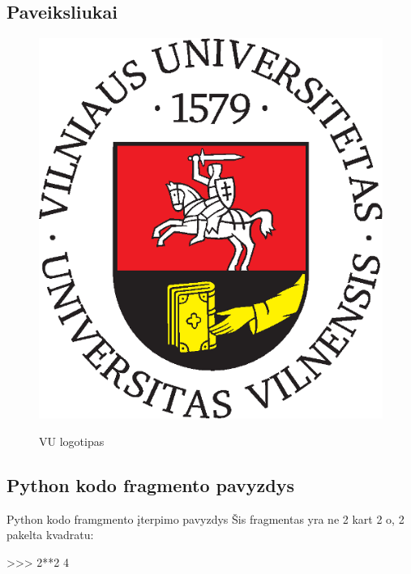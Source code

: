 \documentclass{beamer}
\begin{document}
\subsection{Paveiksliukai}
\begin{frame}

\begin{figure}[!htbp]
    \includegraphics[scale=0.43]{vu_logo}
    \label{fig:vu logo}

    \caption{VU logotipas}
\end{figure}

\end{frame}

\subsection{Python kodo fragmento pavyzdys}
\begin{frame}[fragile]{Python kodo framgmento įterpimo pavyzdys}
Šis fragmentas yra ne 2 kart 2 o, 2 pakelta kvadratu:
\begin{python}
>>> 2**2
4
\end{python}
\end{frame}
\end{document}
